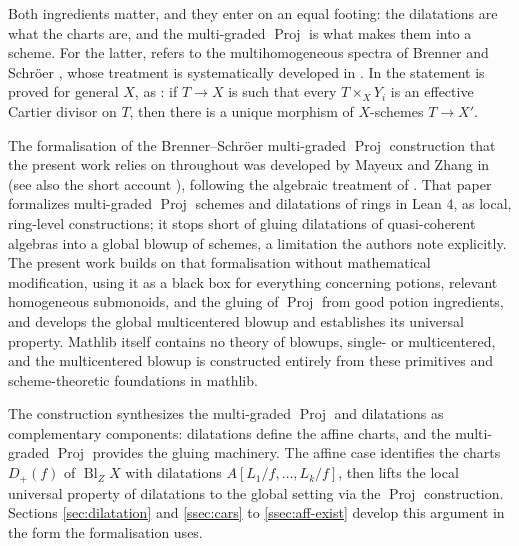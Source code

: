 \documentclass[pdflatex,sn-mathphys-num]{sn-jnl}
\theoremstyle{plain}
\theoremstyle{definition}
\newcommand{\Proj}{\operatorname{Proj}}
\newcommand{\Bl}{\operatorname{Bl}}
\begin{document}
Both ingredients matter, and they enter on an equal footing: the dilatations
are what the charts are, and the multi-graded $\Proj$ is what makes them into a
scheme. For the latter, \cite{mayeux-dilatations-v4} refers to the
multihomogeneous spectra of Brenner and Schr\"oer \cite{brenner-schroer}, whose
treatment is systematically developed in \cite{mayeux-riche}. In \cite{mayeux-riche} the statement is proved for
general $X$, as \cite[Proposition 3.30]{mayeux-riche}: if $T \to X$ is such
that every $T \times_X Y_i$ is an effective Cartier divisor on $T$, then there
is a unique morphism of $X$-schemes $T \to X'$.

The formalisation of the Brenner–Schröer multi-graded $\Proj$ construction that
the present work relies on throughout was developed by Mayeux and Zhang in
\cite{mayeux-zhang} (see also the short account \cite{mayeux-zhang-short}),
following the algebraic treatment of \cite{mayeux-riche}. That paper formalizes multi-graded $\Proj$
schemes and dilatations of rings in Lean 4, as local, ring-level
constructions; it stops short of gluing dilatations of quasi-coherent
algebras into a global blowup of schemes, a limitation the authors note
explicitly. The present work builds on that formalisation without mathematical
modification, using it as a black box for everything concerning potions,
relevant homogeneous submonoids, and the gluing of $\Proj$ from good potion
ingredients, and develops the global multicentered blowup and establishes its universal
property. Mathlib itself contains no theory of blowups, single- or
multicentered, and the multicentered blowup is constructed entirely from these primitives and scheme-theoretic foundations in mathlib.

The construction synthesizes the multi-graded $\Proj$ and dilatations as complementary
components: dilatations define the affine charts, and the multi-graded $\Proj$
provides the gluing machinery. The affine case identifies the charts
$D_+(f)$ of $\Bl_Z X$ with dilatations $A[L_1/f, \dots, L_k/f]$, then
lifts the local universal property of dilatations to the global setting via the
$\Proj$ construction. Sections \ref{sec:dilatation} and
\ref{ssec:cars} to \ref{ssec:aff-exist} develop this argument in the
form the formalisation uses.
\end{document}
